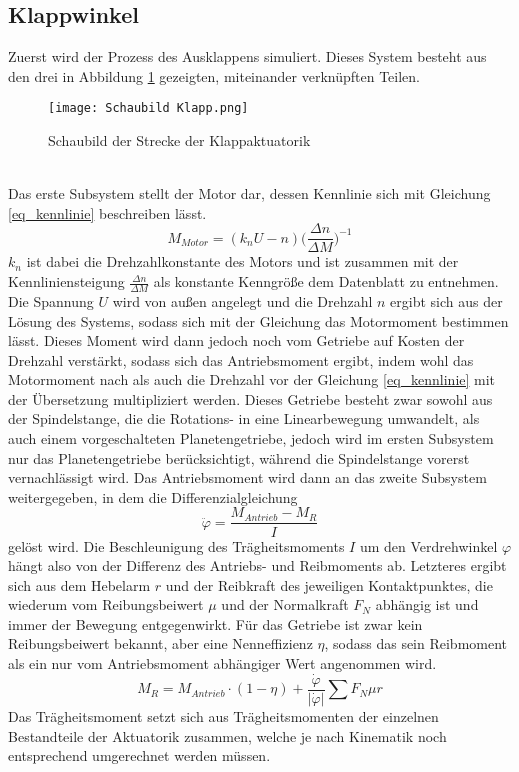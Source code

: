 \subsection{Klappwinkel}
Zuerst wird der Prozess des Ausklappens simuliert. Dieses System besteht aus den drei in Abbildung \ref{abb_klappStrecke} gezeigten, miteinander verknüpften Teilen. 
\begin{figure}[h] 
	\centering
	\texttt{[image: Schaubild Klapp.png]}
	\caption{Schaubild der Strecke der Klappaktuatorik}
	\label{abb_klappStrecke}
\end{figure}\\
Das erste Subsystem stellt der Motor dar, dessen Kennlinie sich mit Gleichung \ref{eq_kennlinie} beschreiben lässt.
\begin{equation}\label{eq_kennlinie}
	M_{Motor} = (k_nU-n)\bigg(\frac{\Delta n}{\Delta M}\bigg)^{-1}
\end{equation}
$k_n$ ist dabei die Drehzahlkonstante des Motors und ist zusammen mit der Kennliniensteigung $\frac{\Delta n}{\Delta M}$ als konstante Kenngröße dem Datenblatt zu entnehmen. Die Spannung $U$ wird von außen angelegt und die Drehzahl $n$ ergibt sich aus der Lösung des Systems, sodass sich mit der Gleichung das Motormoment bestimmen lässt. Dieses Moment wird dann jedoch noch vom Getriebe auf Kosten der Drehzahl verstärkt, sodass sich das Antriebsmoment ergibt, indem wohl das Motormoment nach als auch die Drehzahl vor der Gleichung \ref{eq_kennlinie} mit der Übersetzung multipliziert werden. Dieses Getriebe besteht zwar sowohl aus der Spindelstange, die die Rotations- in eine Linearbewegung umwandelt, als auch einem vorgeschalteten Planetengetriebe, jedoch wird im ersten Subsystem nur das Planetengetriebe berücksichtigt, während die Spindelstange vorerst vernachlässigt wird. Das Antriebsmoment wird dann an das zweite Subsystem weitergegeben, in dem die Differenzialgleichung
\begin{equation}
	\ddot{\varphi} = \frac{M_{Antrieb} - M_{R}}{I}
\end{equation}
gelöst wird. Die Beschleunigung des Trägheitsmoments $I$ um den Verdrehwinkel $\varphi$ hängt also von der Differenz des Antriebs- und Reibmoments ab. Letzteres ergibt sich aus dem Hebelarm $r$ und der Reibkraft des jeweiligen Kontaktpunktes, die wiederum vom Reibungsbeiwert $\mu$ und der Normalkraft $F_N$ abhängig ist und immer der Bewegung entgegenwirkt. Für das Getriebe ist zwar kein Reibungsbeiwert bekannt, aber eine Nenneffizienz $\eta$, sodass das sein Reibmoment als ein nur vom Antriebsmoment abhängiger Wert angenommen wird.
\begin{equation}\label{eq_reibmoment}
	M_R = M_{Antrieb}\cdot(1-\eta)+\frac{\dot{\varphi}}{|\dot{\varphi}|}\sum F_N \mu r
\end{equation}
Das Trägheitsmoment setzt sich aus Trägheitsmomenten der einzelnen Bestandteile der Aktuatorik zusammen, welche je nach Kinematik noch entsprechend umgerechnet werden müssen.

